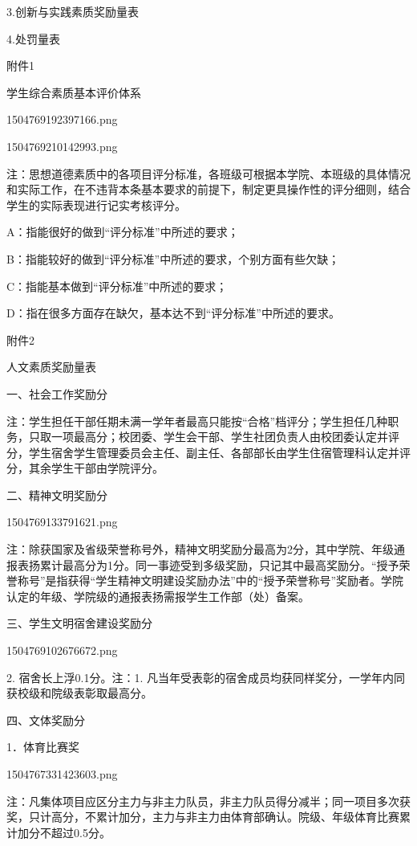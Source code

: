 \documentclass[UTF8,12pt,a4paper]{report}
\begin{document}
3.创新与实践素质奖励量表

4.处罚量表 


 

附件1

  学生综合素质基本评价体系

1504769192397166.png

1504769210142993.png

注：思想道德素质中的各项目评分标准，各班级可根据本学院、本班级的具体情况和实际工作，在不违背本条基本要求的前提下，制定更具操作性的评分细则，结合学生的实际表现进行记实考核评分。 

A：指能很好的做到“评分标准”中所述的要求；

B：指能较好的做到“评分标准”中所述的要求，个别方面有些欠缺；

C：指能基本做到“评分标准”中所述的要求；

D：指在很多方面存在缺欠，基本达不到“评分标准”中所述的要求。


 

附件2

人文素质奖励量表



一、社会工作奖励分



注：学生担任干部任期未满一学年者最高只能按“合格”档评分；学生担任几种职务，只取一项最高分；校团委、学生会干部、学生社团负责人由校团委认定并评分，学生宿舍学生管理委员会主任、副主任、各部部长由学生住宿管理科认定并评分，其余学生干部由学院评分。

二、精神文明奖励分

1504769133791621.png

注：除获国家及省级荣誉称号外，精神文明奖励分最高为2分，其中学院、年级通报表扬累计最高分为1分。同一事迹受到多级奖励，只记其中最高奖励分。“授予荣誉称号”是指获得“学生精神文明建设奖励办法”中的“授予荣誉称号”奖励者。学院认定的年级、学院级的通报表扬需报学生工作部（处）备案。

三、学生文明宿舍建设奖励分

1504769102676672.png

2. 宿舍长上浮0.1分。注：1. 凡当年受表彰的宿舍成员均获同样奖分，一学年内同获校级和院级表彰取最高分。

 

四、文体奖励分

1．体育比赛奖

1504767331423603.png

注：凡集体项目应区分主力与非主力队员，非主力队员得分减半；同一项目多次获奖，只计高分，不累计加分，主力与非主力由体育部确认。院级、年级体育比赛累计加分不超过0.5分。
\end{document}
